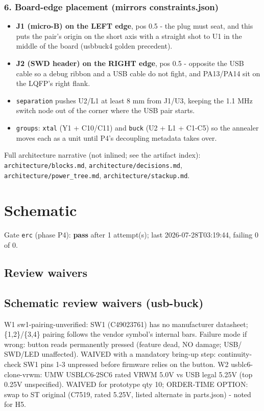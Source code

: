 \documentclass[11pt,a4paper]{article}
\begin{document}
\subsubsection*{6. Board-edge placement (mirrors constraints.json)}
\begin{itemize}
\item \textbf{J1 (micro-B) on the LEFT edge}, pos 0.5 - the plug must seat, and this
puts the pair's origin on the short axis with a straight shot to U1 in the
middle of the board (usbbuck4 golden precedent).
\item \textbf{J2 (SWD header) on the RIGHT edge}, pos 0.5 - opposite the USB cable so
a debug ribbon and a USB cable do not fight, and PA13/PA14 sit on the
LQFP's right flank.
\item \texttt{separation} pushes U2/L1 at least 8 mm from J1/U3, keeping the 1.1 MHz
switch node out of the corner where the USB pair starts.
\item \texttt{groups}: \texttt{xtal} (Y1 + C10/C11) and \texttt{buck} (U2 + L1 + C1-C5) so the
annealer moves each as a unit until P4's decoupling metadata takes over.
\end{itemize}
Full architecture narrative (not inlined; see the artifact index): \texttt{architecture/blocks.md}, \texttt{architecture/decisions.md}, \texttt{architecture/power\_tree.md}, \texttt{architecture/stackup.md}.
\section{Schematic}
Gate \texttt{erc} (phase P4): \textbf{pass} after 1 attempt(s); last 2026-07-28T03:19:44, failing 0 of 0.
\subsection*{Review waivers}
\subsection*{Schematic review waivers (usb-buck)}
W1 sw1-pairing-unverified: SW1 (C49023761) has no manufacturer datasheet; \{1,2\}/\{3,4\} pairing follows the vendor symbol's internal bars. Failure mode if wrong: button reads permanently pressed (feature dead, NO damage; USB/ SWD/LED unaffected). WAIVED with a mandatory bring-up step: continuity-check SW1 pins 1-3 unpressed before firmware relies on the button. W2 usblc6-clone-vrwm: UMW USBLC6-2SC6 rated VRWM 5.0V vs USB legal 5.25V (top 0.25V unspecified). WAIVED for prototype qty 10; ORDER-TIME OPTION: swap to ST original (C7519, rated 5.25V, listed alternate in parts.json) - noted for H5.
\end{document}
